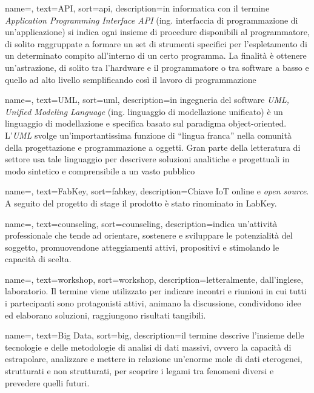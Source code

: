 \renewcommand{\glossaryname}{Glossario}

{
    name=,
    text=API,
    sort=api,
    description={in informatica con il termine \emph{Application Programming Interface API} (ing. interfaccia di programmazione di un'applicazione) si indica ogni insieme di procedure disponibili al programmatore, di solito raggruppate a formare un set di strumenti specifici per l'espletamento di un determinato compito all'interno di un certo programma. La finalità è ottenere un'astrazione, di solito tra l'hardware e il programmatore o tra software a basso e quello ad alto livello semplificando così il lavoro di programmazione}
}

{
    name=,
    text=UML,
    sort=uml,
    description={in ingegneria del software \emph{UML, Unified Modeling Language} (ing. linguaggio di modellazione unificato) è un linguaggio di modellazione e specifica basato sul paradigma object-oriented. L'\emph{UML} svolge un'importantissima funzione di ``lingua franca'' nella comunità della progettazione e programmazione a oggetti. Gran parte della letteratura di settore usa tale linguaggio per descrivere soluzioni analitiche e progettuali in modo sintetico e comprensibile a un vasto pubblico}
}

{
    name=,
    text=FabKey,
    sort=fabkey,
    description={Chiave IoT online e \textit{open source}. A seguito del progetto di stage il prodotto è stato rinominato in LabKey.}
}

{
	name=,
    text=counseling,
    sort=counseling,
    description={indica un'attività professionale che tende ad orientare, sostenere e sviluppare le potenzialità del soggetto, promuovendone atteggiamenti attivi, propositivi e stimolando le capacità di scelta.}
}

{
	name=,
    text=workshop,
    sort=workshop,
    description={letteralmente, dall'inglese, laboratorio. Il termine viene utilizzato per indicare incontri e riunioni in cui tutti i partecipanti sono protagonisti attivi, animano la discussione, condividono idee ed elaborano soluzioni, raggiungono risultati tangibili.}
}

{
	name=,
    text=Big Data,
    sort=big,
    description={il termine descrive l'insieme delle tecnologie e delle metodologie di analisi di dati massivi, ovvero la capacità di estrapolare, analizzare e mettere in relazione un'enorme mole di dati eterogenei, strutturati e non strutturati, per scoprire i legami tra fenomeni diversi e prevedere quelli futuri.}
}

